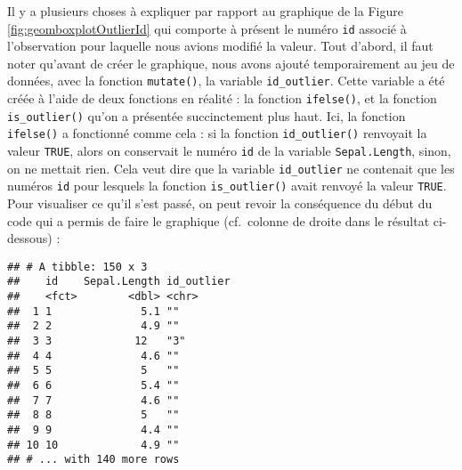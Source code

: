 \documentclass[
  french,
]{book}
\newenvironment{Shaded}{\begin{snugshade}}{\end{snugshade}}
\newcommand{\DataTypeTok}[1]{\textcolor[rgb]{0.13,0.29,0.53}{#1}}
\newcommand{\DecValTok}[1]{\textcolor[rgb]{0.00,0.00,0.81}{#1}}
\newcommand{\KeywordTok}[1]{\textcolor[rgb]{0.13,0.29,0.53}{\textbf{#1}}}
\newcommand{\NormalTok}[1]{#1}
\newcommand{\OperatorTok}[1]{\textcolor[rgb]{0.81,0.36,0.00}{\textbf{#1}}}
\newcommand{\StringTok}[1]{\textcolor[rgb]{0.31,0.60,0.02}{#1}}
\begin{document}
Il y a plusieurs choses à expliquer par rapport au graphique de la Figure \ref{fig:geomboxplotOutlierId} qui comporte à présent le numéro \texttt{id} associé à l'observation pour laquelle nous avions modifié la valeur. Tout d'abord, il faut noter qu'avant de créer le graphique, nous avons ajouté temporairement au jeu de données, avec la fonction \texttt{mutate()}, la variable \texttt{id\_outlier}. Cette variable a été créée à l'aide de deux fonctions en réalité : la fonction \texttt{ifelse()}, et la fonction \texttt{is\_outlier()} qu'on a présentée succinctement plus haut. Ici, la fonction \texttt{ifelse()} a fonctionné comme cela : si la fonction \texttt{id\_outlier()} renvoyait la valeur \texttt{TRUE}, alors on conservait le numéro \texttt{id} de la variable \texttt{Sepal.Length}, sinon, on ne mettait rien. Cela veut dire que la variable \texttt{id\_outlier} ne contenait que les numéros \texttt{id} pour lesquels la fonction \texttt{is\_outlier()} avait renvoyé la valeur \texttt{TRUE}. Pour visualiser ce qu'il s'est passé, on peut revoir la conséquence du début du code qui a permis de faire le graphique (cf.~colonne de droite dans le résultat ci-dessous) :

\begin{Shaded}
\end{Shaded}

\begin{verbatim}
## # A tibble: 150 x 3
##    id    Sepal.Length id_outlier
##    <fct>        <dbl> <chr>     
##  1 1              5.1 ""        
##  2 2              4.9 ""        
##  3 3             12   "3"       
##  4 4              4.6 ""        
##  5 5              5   ""        
##  6 6              5.4 ""        
##  7 7              4.6 ""        
##  8 8              5   ""        
##  9 9              4.4 ""        
## 10 10             4.9 ""        
## # ... with 140 more rows
\end{verbatim}
\end{document}
